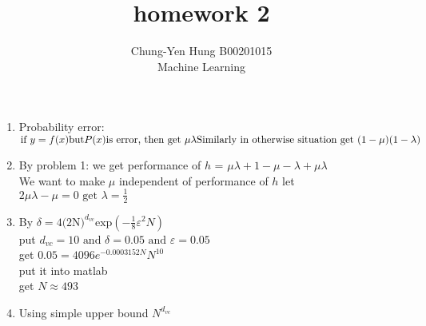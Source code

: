 \documentclass[12pt]{article}
\begin{document}

\title{homework 2}
\author{Chung-Yen Hung B00201015\\ %
 Machine Learning} %

\maketitle

\begin{enumerate}
    \item
      Probability error: $ \text{if } y = f(x) \text{but} P(x) \text{is error, then get } \mu\lambda \\ \text{Similarly in otherwise situation get } (1-\mu)(1-\lambda)$
    \item
      By problem 1: we get performance of $ h $ = $ \mu\lambda + 1 - \mu - \lambda + \mu\lambda$ \\
      We want to make $ \mu $ independent of performance of $ h $ let $ 2\mu\lambda - \mu = 0 \text{ get } \lambda = \frac{1}{2}$
    \item
      By $ \delta = 4\text{(2N)}^{d_{vc}}\text{exp}(-\frac{1}{8}\varepsilon^{2}N)$\\
      put $ d_{vc} = 10 \text{ and } \delta = 0.05 \text{ and } \varepsilon = 0.05$ \\
      get $ 0.05 = 4096e^{-0.0003152N}N^{10}$ \\
      put it into matlab\\
      get $ N \approx 493$
    \item
      Using simple upper bound $ N^{d_{vc}} $ \\
      \begin{enumerate}
      \end{enumerate}
\end{enumerate}
\end{document}
